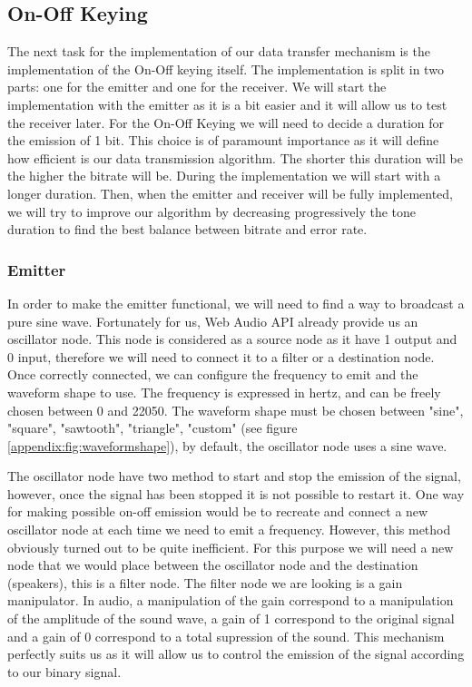 \documentclass[twocolumn,14pt]{extarticle}
\begin{document}
\subsection{On-Off Keying}
The next task for the implementation of our data transfer mechanism is the implementation of the On-Off keying itself. The implementation is split in two parts: one for the emitter and one for the receiver. We will start the implementation with the emitter as it is a bit easier and it will allow us to test the receiver later. For the On-Off Keying we will need to decide a duration for the emission of 1 bit. This choice is of paramount importance as it will define how efficient is our data transmission algorithm. The shorter this duration will be the higher the bitrate will be. During the implementation we will start with a longer duration. Then, when the emitter and receiver will be fully implemented, we will try to improve our algorithm by decreasing progressively the tone duration to find the best balance between bitrate and error rate.	


\subsubsection{Emitter}
In order to make the emitter functional, we will need to find a way to broadcast a pure sine wave. Fortunately for us, Web Audio API already provide us an oscillator node. This node is considered as a source node as it have 1 output and 0 input, therefore we will need to connect it to a filter or a destination node. Once correctly connected, we can configure the frequency to emit and the waveform shape to use. The frequency is expressed in hertz, and can be freely chosen between 0 and 22050. The waveform shape must be chosen between "sine", "square", "sawtooth", "triangle", "custom" (see figure \ref{appendix:fig:waveformshape}), by default, the oscillator node uses a sine wave. 

The oscillator node have two method to start and stop the emission of the signal, however, once the signal has been stopped it is not possible to restart it. One way for making possible on-off emission would be to recreate and connect a new oscillator node at each time we need to emit a frequency. However, this method obviously turned out to be quite inefficient. For this purpose we will need a new node that we would place between the oscillator node and the destination (speakers), this is a filter node. The filter node we are looking is a gain manipulator. In audio, a manipulation of the gain correspond to a manipulation of the amplitude of the sound wave, a gain of 1 correspond to the original signal and a gain of 0 correspond to a total supression of the sound. This mechanism perfectly suits us as it will allow us to control the emission of the signal according to our binary signal.
\end{document}
